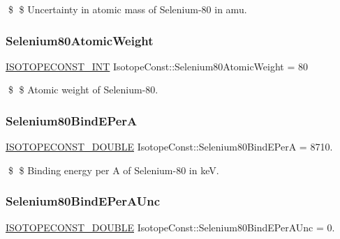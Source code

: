 \$ \$ Uncertainty in atomic mass of Selenium-\/80 in amu. \mbox{\label{group___isotope_const-_selenium-_se80_ga89d8bf2a7983c65ed6a7f77c7ae514b5}} 
\subsubsection{\texorpdfstring{Selenium80\+Atomic\+Weight}{Selenium80AtomicWeight}}
{\footnotesize\ttfamily \mbox{\hyperlink{group___isotope_const-_macros_ga5f18360b3e99483a35c32d789e62621c}{I\+S\+O\+T\+O\+P\+E\+C\+O\+N\+S\+T\+\_\+\+I\+NT}} Isotope\+Const\+::\+Selenium80\+Atomic\+Weight = 80}

\$ \$ Atomic weight of Selenium-\/80. \mbox{\label{group___isotope_const-_selenium-_se80_ga20d802c38f6c2d1be5fd5470402724e5}} 
\subsubsection{\texorpdfstring{Selenium80\+Bind\+E\+PerA}{Selenium80BindEPerA}}
{\footnotesize\ttfamily \mbox{\hyperlink{group___isotope_const-_macros_ga8f45a7272ce02c0b4c65c44636ed719a}{I\+S\+O\+T\+O\+P\+E\+C\+O\+N\+S\+T\+\_\+\+D\+O\+U\+B\+LE}} Isotope\+Const\+::\+Selenium80\+Bind\+E\+PerA = 8710.}

\$ \$ Binding energy per A of Selenium-\/80 in keV. \mbox{\label{group___isotope_const-_selenium-_se80_ga69ca10710351ad8ba799aefcfd90c56e}} 
\subsubsection{\texorpdfstring{Selenium80\+Bind\+E\+Per\+A\+Unc}{Selenium80BindEPerAUnc}}
{\footnotesize\ttfamily \mbox{\hyperlink{group___isotope_const-_macros_ga8f45a7272ce02c0b4c65c44636ed719a}{I\+S\+O\+T\+O\+P\+E\+C\+O\+N\+S\+T\+\_\+\+D\+O\+U\+B\+LE}} Isotope\+Const\+::\+Selenium80\+Bind\+E\+Per\+A\+Unc = 0.}

